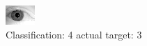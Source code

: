 \begin{figure}[h!]
\begin{center}
\includegraphics[width=0.60\columnwidth]{figures/ID2080_class_4_target_3.png}
\end{center}
\caption{ Classification: 4 actual target: 3}
\label{fig:ID2080_class_4_target_3}
\end{figure}
